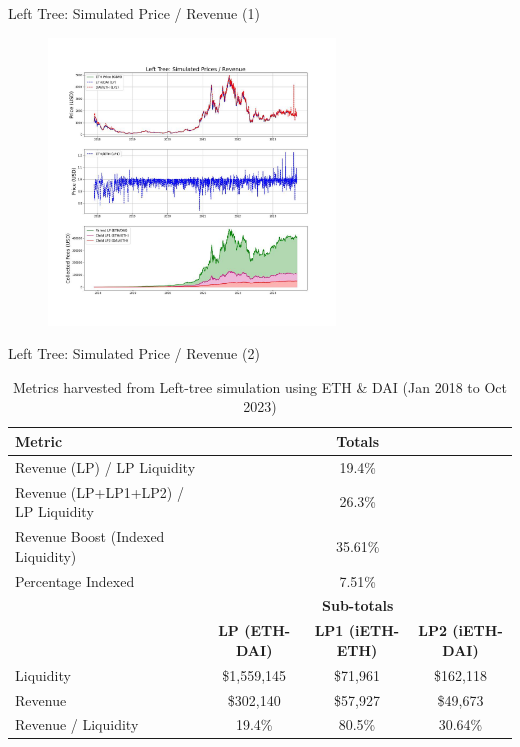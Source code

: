 \documentclass[10pt,xcolor=svgnames]{beamer} %
\begin{document}
\begin{frame}{Left Tree: Simulated Price / Revenue (1)}

\begin{figure}[h!]
\includegraphics[width=3in]{img/simulation.jpg}
\label{fig:simulation}
\end{figure}

\end{frame}


\begin{frame}{Left Tree: Simulated Price / Revenue (2)}


\begin{table}[h]
\tiny
\centering
\begin{tabular}{ |l|c|c|c| } 
\hline
 \textbf{Metric} & \multicolumn{3}{|c|}{\textbf{Totals}}\\
\hline 
 Revenue (LP) / LP Liquidity & \multicolumn{3}{|c|}{19.4\% }\\
 Revenue (LP+LP1+LP2) / LP Liquidity & \multicolumn{3}{|c|}{26.3\% }\\
 Revenue Boost (Indexed Liquidity)  & \multicolumn{3}{|c|}{35.61\%}\\ 
 Percentage Indexed & \multicolumn{3}{|c|}{7.51\%}\\ 
 \hline
\hline
	& \multicolumn{3}{|c|}{\textbf{Sub-totals}} \\
  & \textbf{LP (ETH-DAI)} & \textbf{LP1 (iETH-ETH)} & \textbf{LP2 (iETH-DAI)} \\
\hline
Liquidity  & \$1,559,145 & \$71,961 & \$162,118\\
Revenue  & \$302,140 & \$57,927 & \$49,673\\
Revenue / Liquidity  & 19.4\% & 80.5\% & 30.64\%\\ 
\hline
\end{tabular}
\caption{Metrics harvested from Left-tree simulation using ETH \& DAI (Jan 2018 to Oct 2023)}
\label{table:simulator_components}
\end{table}

\end{frame}
\end{document}
